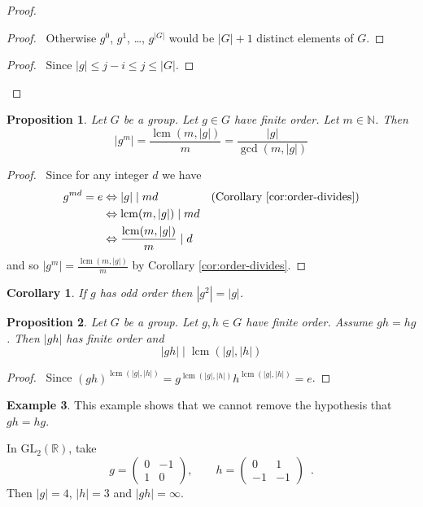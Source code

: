 \documentclass{book}
\let\qed\relax
\newtheorem{prop}{Proposition}[chapter]
\newtheorem{cor}{Corollary}[prop]
\theoremstyle{definition}
\newtheorem{ex}[prop]{Example}
\newcommand{\lcm}{\ensuremath{\operatorname{lcm}}}
\begin{document}
\begin{proof}
    \pf
    \begin{proof}
        \pf\ Otherwise $g^0$, $g^1$, \ldots, $g^{|G|}$ would be $|G| + 1$ distinct elements of $G$.
    \end{proof}
    \begin{proof}
        \pf\ Since $|g| \leq j - i \leq j \leq |G|$.
    \end{proof}
    \qed
\end{proof}

\begin{prop}
\label{prop:order-of-g-to-the-m}
    Let $G$ be a group. Let $g \in G$ have finite order. Let $m \in \mathbb{N}$. Then
    \[ |g^m| = \frac{\lcm(m,|g|)}{m} = \frac{|g|}{\gcd(m,|g|)}\]
\end{prop}

\begin{proof}
    \pf\ Since for any integer $d$ we have
    \begin{align*}
        g^{md} = e & \Leftrightarrow |g| \mid md                  & (\text{Corollary \ref{cor:order-divides}}) \\
                   & \Leftrightarrow \lcm(m,|g|) \mid md                                                       \\
                   & \Leftrightarrow \frac{\lcm(m,|g|)}{m} \mid d & \qed
    \end{align*}
    and so $|g^m| = \frac{\lcm(m,|g|)}{m}$ by Corollary \ref{cor:order-divides}. \qed
\end{proof}

\begin{cor}
    If $g$ has odd order then $|g^2| = |g|$.
\end{cor}

\begin{prop}
    \label{prop:order-gh}
    Let $G$ be a group. Let $g,h \in G$ have finite order. Assume $gh = hg$. Then $|gh|$ has finite order and
    \[ |gh| \mid \lcm(|g|,|h|)\]
\end{prop}

\begin{proof}
    \pf\ Since $(gh)^{\lcm(|g|,|h|)} = g^{\lcm(|g|,|h|)}h^{\lcm(|g|,|h|)} = e$. \qed
\end{proof}

\begin{ex}
    This example shows that we cannot remove the hypothesis that $gh = hg$.

    In $\mathrm{GL}_2(\mathbb{R})$, take
    \[ g = \left( \begin{array}{cc} 0 & -1 \\ 1 & 0 \end{array} \right), \qquad
        h = \left( \begin{array}{cc} 0 & 1 \\ -1 & -1 \end{array} \right) \enspace . \]
    Then $|g| = 4$, $|h| = 3$ and $|gh| = \infty$.
\end{ex}
\end{document}
